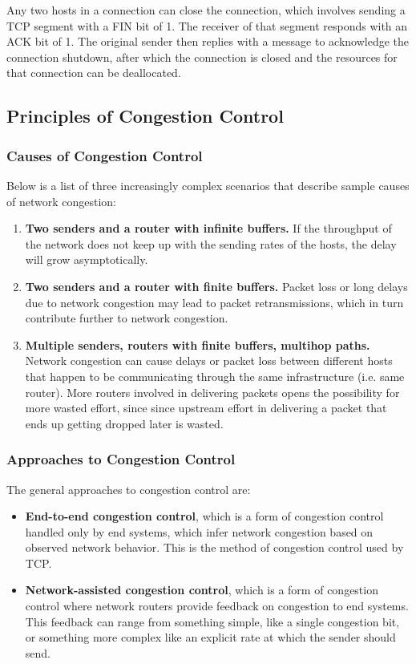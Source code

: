 \documentclass[12pt,titlepage]{article}
\begin{document}
        Any two hosts in a connection can close the connection, which involves sending a TCP segment with a FIN bit of 1. The receiver of that segment responds with an ACK bit of 1. The
        original sender then replies with a message to acknowledge the connection shutdown, after which the connection is closed and the resources for that connection can be deallocated.

    \subsection{Principles of Congestion Control}

      \subsubsection{Causes of Congestion Control}
        Below is a list of three increasingly complex scenarios that describe sample causes of network congestion:
        \begin{enumerate}
          \item \textbf{Two senders and a router with infinite buffers.} If the throughput of the network does not keep up with the sending rates of the hosts, the delay will grow
            asymptotically.
          \item \textbf{Two senders and a router with finite buffers.} Packet loss or long delays due to network congestion may lead to packet retransmissions, which in turn contribute
            further to network congestion.
          \item \textbf{Multiple senders, routers with finite buffers, multihop paths.} Network congestion can cause delays or packet loss between different hosts that happen to be
            communicating through the same infrastructure (i.e. same router). More routers involved in delivering packets opens the possibility for more wasted effort, since since
            upstream effort in delivering a packet that ends up getting dropped later is wasted.
        \end{enumerate}

      \subsubsection{Approaches to Congestion Control}
        The general approaches to congestion control are:
        \begin{itemize}
          \item \textbf{End-to-end congestion control}, which is a form of congestion control handled only by end systems, which infer network congestion based on observed network behavior. 
            This is the method of congestion control used by TCP.
          \item \textbf{Network-assisted congestion control}, which is a form of congestion control where network routers provide feedback on congestion to end systems. This feedback can
            range from something simple, like a single congestion bit, or something more complex like an explicit rate at which the sender should send.
        \end{itemize}
\end{document}
